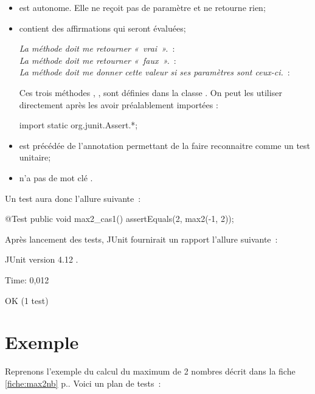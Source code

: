 \begin{itemize}
	\item est autonome. Elle ne reçoit pas de paramètre et ne retourne rien;
	
	\item contient des affirmations qui seront évaluées;

		\textit{La méthode doit me retourner «~vrai~».}~: \\
		\textit{La méthode doit me retourner «~faux~».}~: \\
		\textit{La méthode doit me donner cette valeur si ses paramètres sont
		ceux-ci.}~:\\

              Ces trois méthodes , ,  sont définies dans la classe .
              On peut les utiliser directement après les avoir préalablement importées :
\begin{java}
import static org.junit.Assert.*;
\end{java}
              

	\item est précédée de l'annotation  permettant de la faire
		reconnaitre comme un test unitaire;

	\item n'a pas de mot clé .

\end{itemize}

Un test aura donc l'allure suivante~:

\begin{java}
@Test
public void max2_cas1(){
	assertEquals(2, max2(-1, 2));
}
\end{java}

Après lancement des tests, JUnit fournirait un rapport l'allure suivante~:

\begin{term}
JUnit version 4.12
.

Time: 0,012

OK (1 test)
\end{term}

\section{Exemple}

Reprenons l'exemple du calcul du maximum de 2 nombres décrit dans la fiche
\ref{fiche:max2nb} p.\pageref{fiche:max2nb}. Voici un plan de tests~:

